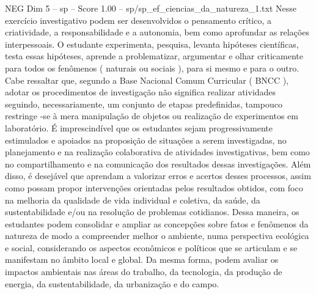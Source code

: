 \begin{textsample}{NEG Dim 5 – sp – Score 1.00 – sp/sp\_ef\_ciencias\_da\_natureza\_1.txt}
Nesse exercício investigativo podem ser desenvolvidos o pensamento crítico, a criatividade, a responsabilidade e a autonomia, bem como aprofundar as relações interpessoais.
O estudante experimenta, pesquisa, levanta hipóteses científicas, testa essas hipóteses, aprende a problematizar, argumentar e olhar criticamente para todos os fenômenos ( naturais ou sociais ), para si mesmo e para o outro.
Cabe ressaltar que, segundo a Base Nacional Comum Curricular ( BNCC ), adotar os procedimentos de investigação não significa realizar atividades seguindo, necessariamente, um conjunto de etapas predefinidas, tampouco restringe -se à mera manipulação de objetos ou realização de experimentos em laboratório.
É imprescindível que os estudantes sejam progressivamente estimulados e apoiados na proposição de situações a serem investigadas, no planejamento e na realização colaborativa de atividades investigativas, bem como no compartilhamento e na comunicação dos resultados dessas investigações.
Além disso, é desejável que aprendam a valorizar erros e acertos desses processos, assim como possam propor intervenções orientadas pelos resultados obtidos, com foco na melhoria da qualidade de vida individual e coletiva, da saúde, da sustentabilidade e/ou na resolução de problemas cotidianos.
Dessa maneira, os estudantes podem consolidar e ampliar as concepções sobre fatos e fenômenos da natureza de modo a compreender melhor o ambiente, numa perspectiva ecológica e social, considerando os aspectos econômicos e políticos que se articulam e se manifestam no âmbito local e global.
Da mesma forma, podem avaliar os impactos ambientais nas áreas do trabalho, da tecnologia, da produção de energia, da sustentabilidade, da urbanização e do campo.

\end{textsample}
